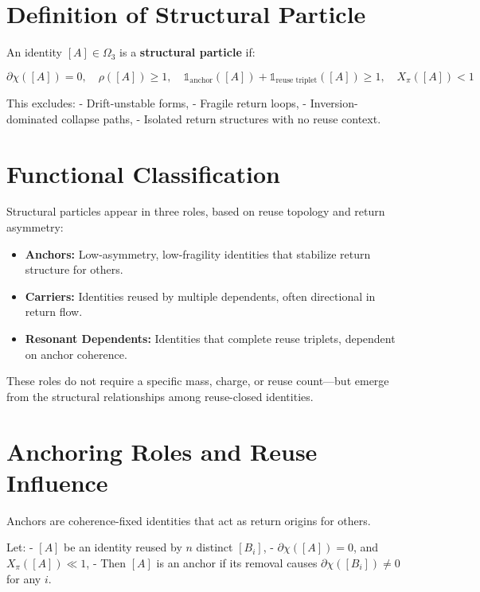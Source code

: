 \section{Definition of Structural Particle} \label{sec:def-structural-particle}

\begin{definition}
An identity $[A] \in \Omega_3$ is a \textbf{structural particle} if:

\[
\partial\chi([A]) = 0,\quad
\rho([A]) \geq 1,\quad
\mathbb{1}_{\text{anchor}}([A]) + \mathbb{1}_{\text{reuse triplet}}([A]) \geq 1,\quad
X_\pi([A]) < 1
\]
\end{definition}

This excludes:
- Drift-unstable forms,
- Fragile return loops,
- Inversion-dominated collapse paths,
- Isolated return structures with no reuse context.

\section{Functional Classification} \label{sec:particle-roles}

Structural particles appear in three roles, based on reuse topology and return asymmetry:

\begin{itemize}
  \item \textbf{Anchors:} Low-asymmetry, low-fragility identities that stabilize return structure for others.
  \item \textbf{Carriers:} Identities reused by multiple dependents, often directional in return flow.
  \item \textbf{Resonant Dependents:} Identities that complete reuse triplets, dependent on anchor coherence.
\end{itemize}

These roles do not require a specific mass, charge, or reuse count—but emerge from the structural relationships among reuse-closed identities.

\section{Anchoring Roles and Reuse Influence} \label{sec:anchoring-roles}

Anchors are coherence-fixed identities that act as return origins for others.

Let:
- $[A]$ be an identity reused by $n$ distinct $[B_i]$,
- $\partial\chi([A]) = 0$, and $X_\pi([A]) \ll 1$,
- Then $[A]$ is an anchor if its removal causes $\partial\chi([B_i]) \ne 0$ for any $i$.

